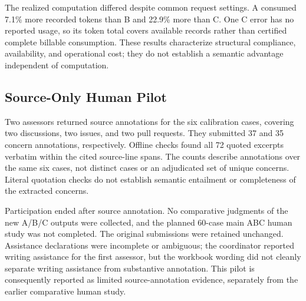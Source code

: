 The realized computation differed despite common request settings.
A consumed 7.1\% more recorded tokens than B and 22.9\% more than C.
One C error has no reported usage, so its token total covers available
records rather than certified complete billable consumption. These results
characterize structural compliance, availability, and operational cost;
they do not establish a semantic advantage independent of computation.

\subsection{Source-Only Human Pilot}
\label{sec:abc-source-pilot}
Two assessors returned source annotations for the six calibration cases,
covering two discussions, two issues, and two pull requests. They submitted
37 and 35 concern annotations, respectively. Offline checks found all 72
quoted excerpts verbatim within the cited source-line spans. The counts
describe annotations over the same six cases, not distinct cases or an
adjudicated set of unique concerns. Literal quotation checks do not establish
semantic entailment or completeness of the extracted concerns.

Participation ended after source annotation. No comparative judgments of
the new A/B/C outputs were collected, and the planned 60-case main ABC human
study was not completed. The original submissions were retained unchanged.
Assistance declarations were incomplete or ambiguous; the coordinator
reported writing assistance for the first assessor, but the workbook wording
did not cleanly separate writing assistance from substantive annotation.
This pilot is consequently reported as limited source-annotation evidence,
separately from the earlier comparative human study.
